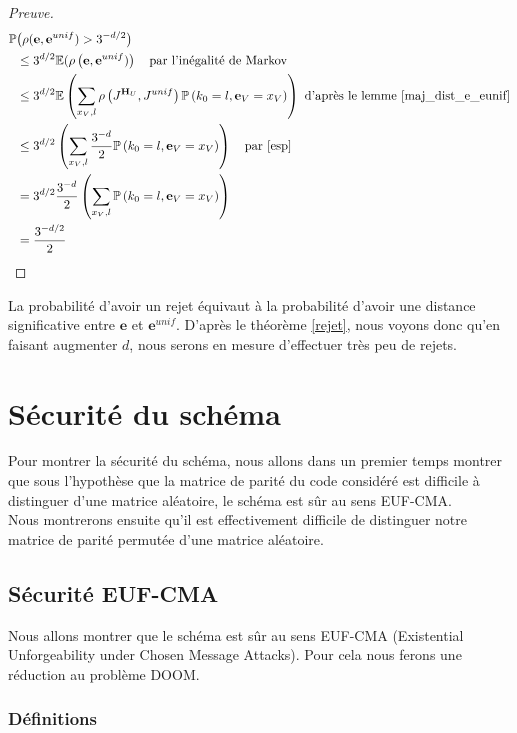 \documentclass[12pt]{article}
\theoremstyle{plain}
\newcommand{\e}{\mathbf{e}}
\begin{document}
\begin{proof}[Preuve]
\begin{equation*}
\begin{split}
\mathbb{P}&\big(\rho(\e,\e^{unif})>3^{-d/2}\big) \\
&\leq 3^{d/2}\mathbb{E}(\rho\left(\e,\e^{unif})\right) \quad \text{par l'inégalité de Markov}\\
&\leq 3^{d/2}\mathbb{E}\left(\sum\limits_{x_V,l} \rho\left(J^{\mathbf{H}_U},J^{unif}\right)\mathbb{P}\left(k_0 = l , \e_V = x_V\right)\right) \text{ d'après le lemme \ref{maj_dist_e_eunif}}\\
&\leq 3^{d/2}\left(\sum\limits_{x_V,l} \frac{3^{-d}}{2}\mathbb{P}\left(k_0 = l ,\e_V = x_V\right)\right) \quad \text{par \eqref{esp}}\\
&= 3^{d/2} \frac{3^{-d}}{2}\left(\sum\limits_{x_V,l}\mathbb{P}\left(k_0 = l ,\e_V = x_V\right)\right) \\
&= \frac{3^{-d/2}}{2}\\
\end{split}
\end{equation*}
\end{proof}


\noindent La probabilité d'avoir un rejet équivaut à la probabilité d'avoir une distance significative entre $\e$ et $\e^{unif}$. D'après le théorème \ref{rejet}, nous voyons donc qu'en faisant augmenter $d$, nous serons en mesure d'effectuer très peu de rejets.


\section{Sécurité du schéma}
Pour montrer la sécurité du schéma, nous allons dans un premier temps montrer que sous l'hypothèse que la matrice de parité du code considéré est difficile à distinguer d'une matrice aléatoire, le schéma est sûr au sens EUF-CMA.\\
Nous montrerons ensuite qu'il est effectivement difficile de distinguer notre matrice de parité permutée d'une matrice aléatoire. \\

\subsection{Sécurité EUF-CMA}
Nous allons montrer que le schéma est sûr au sens EUF-CMA (Existential Unforgeability under Chosen Message Attacks). Pour cela nous ferons une réduction au problème DOOM.
\subsubsection{Définitions}
\end{document}
